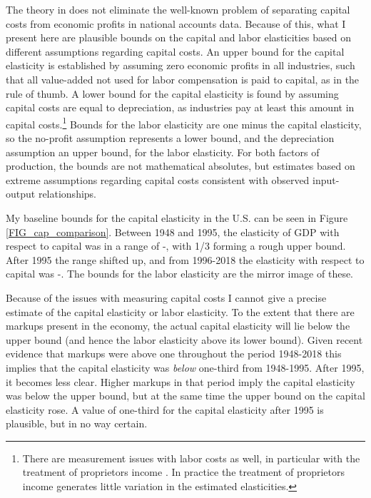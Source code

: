 \documentclass[11pt]{article}
\begin{document}
The theory in \cite{bfshortnote,bfprodge} does not eliminate the well-known problem of separating capital costs from economic profits in national accounts data. Because of this, what I present here are plausible bounds on the capital and labor elasticities based on different assumptions regarding capital costs. An upper bound for the capital elasticity is established by assuming zero economic profits in all industries, such that all value-added not used for labor compensation is paid to capital, as in the rule of thumb. A lower bound for the capital elasticity is found by assuming capital costs are equal to depreciation, as industries pay at least this amount in capital costs.\footnote{There are measurement issues with labor costs as well, in particular with the treatment of proprietors income \citep{Gollin:2002zr,gommerupert2004,elsbyhs2013}. In practice the treatment of proprietors income generates little variation in the estimated elasticities.} Bounds for the labor elasticity are one minus the capital elasticity, so the no-profit assumption represents a lower bound, and the depreciation assumption an upper bound, for the labor elasticity. For both factors of production, the bounds are not mathematical absolutes, but estimates based on extreme assumptions regarding capital costs consistent with observed input-output relationships.  

My baseline bounds for the capital elasticity in the U.S. can be seen in Figure \ref{FIG_cap_comparison}. Between 1948 and 1995, the elasticity of GDP with respect to capital was in a range of \baseearlydepr-\baseearlynoprofit, with 1/3 forming a rough upper bound. After 1995 the range shifted up, and from 1996-2018 the elasticity with respect to capital was \baselatedepr-\baselatenoprofit. The bounds for the labor elasticity are the mirror image of these.

Because of the issues with measuring capital costs I cannot give a precise estimate of the capital elasticity or labor elasticity. To the extent that there are markups present in the economy, the actual capital elasticity will lie below the upper bound (and hence the labor elasticity above its lower bound). Given recent evidence that markups were above one throughout the period 1948-2018 \citep{Barkai000,edmondetal2018,dleu2020,RePEc:nbr:nberwo:22897,basu2019} this implies that the capital elasticity was \textit{below} one-third from 1948-1995. After 1995, it becomes less clear. Higher markups in that period imply the capital elasticity was below the upper bound, but at the same time the upper bound on the capital elasticity rose. A value of one-third for the capital elasticity after 1995 is plausible, but in no way certain.
\end{document}
